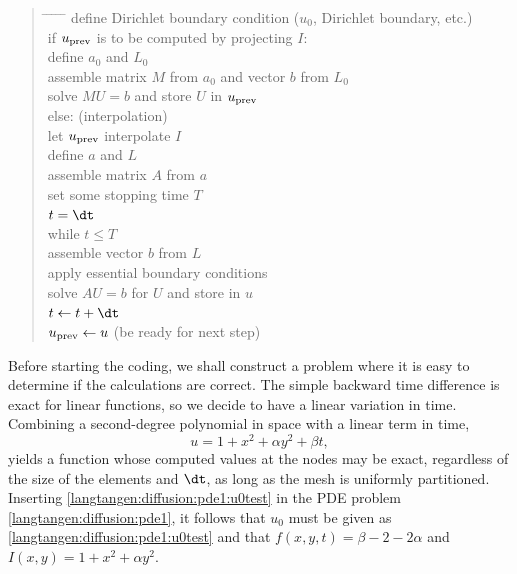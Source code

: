 \begin{quote}
\begin{tabbing}
\hspace*{0.5cm}\= \hspace{0.5cm} \= \hspace{0.5cm} \=
\hspace{0.5cm} \= \hspace{0.5cm} \= \kill
define Dirichlet boundary condition ($u_0$, Dirichlet boundary, etc.)\\
if $u_{\rm prev}$ is to be computed by projecting $I$:\\
\>define $a_0$ and $L_0$\\
\> assemble matrix $M$ from $a_0$ and vector $b$ from $L_0$\\
\> solve $MU=b$ and store $U$ in $u_{\rm prev}$\\
else:  (interpolation)\\
\> let $u_{\rm prev}$ interpolate $I$\\
define $a$ and $L$\\
assemble matrix $A$ from $a$\\
set some stopping time $T$\\
$t={\dt}$\\
while $t\leq T$\\
\> assemble vector $b$ from $L$\\
\> apply essential boundary conditions\\
\> solve $AU=b$ for $U$ and store in $u$\\
\> $t\leftarrow t + {\dt}$\\
\> $u_{\rm prev} \leftarrow u$ (be ready for next step)
\end{tabbing}
\end{quote}

Before starting the coding, we shall construct a problem where it is
easy to determine if the calculations are correct. The simple backward
time difference is exact for linear functions, so we decide to have
a linear variation in time. Combining a second-degree polynomial in space
with a linear term in time,
\begin{equation} u = 1 + x^2 + \alpha y^2 + \beta t,
\label{langtangen:diffusion:pde1:u0test}
\end{equation}
yields a function whose computed values at the nodes may be exact,
regardless of the size of the elements and ${\dt}$, as long as the
mesh is uniformly partitioned.
Inserting \eqref{langtangen:diffusion:pde1:u0test} in the PDE problem
\eqref{langtangen:diffusion:pde1}, it follows that $u_0$ must be given as
\eqref{langtangen:diffusion:pde1:u0test} and that $f(x,y,t)=\beta - 2 - 2\alpha$
and $I(x,y)=1+x^2+\alpha y^2$.


